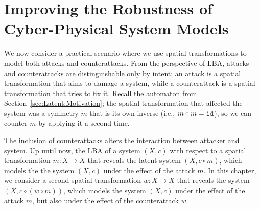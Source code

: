  \chapter{Improving the Robustness of Cyber-Physical System Models}
 \label{ch:CPSRobustness}  
 
 We now consider a practical scenario where we use spatial transformations to model both attacks and counterattacks. From the perspective of LBA, attacks and counterattacks are distinguishable only by intent: an attack is a spatial transformation that aims to damage a system, while a counterattack is a spatial transformation that tries to fix it. Recall the automaton from Section~\ref{sec:Latent:Motivation}; the spatial transformation that affected the system was a symmetry $m$ that is its own inverse (i.e., $m\circ m={\texttt{id}}$), so we can counter $m$ by applying it a second time. 
 
 The inclusion of counterattacks alters the interaction between attacker and system. Up until now, the LBA of a system $(X,c)$ with respect to a spatial transformation $m\colon X\rightarrow X$ that reveals the latent system $(X,c\circ m)$, which models the the system $(X,c)$ under the effect of the attack $m$. In this chapter, we consider a second spatial transformation $w\colon X\rightarrow X$ that reveals the system $(X, c\circ (w\circ m))$, which models the system $(X,c)$ under the effect of the attack $m$, but also under the effect of the counterattack $w$.

   
   
